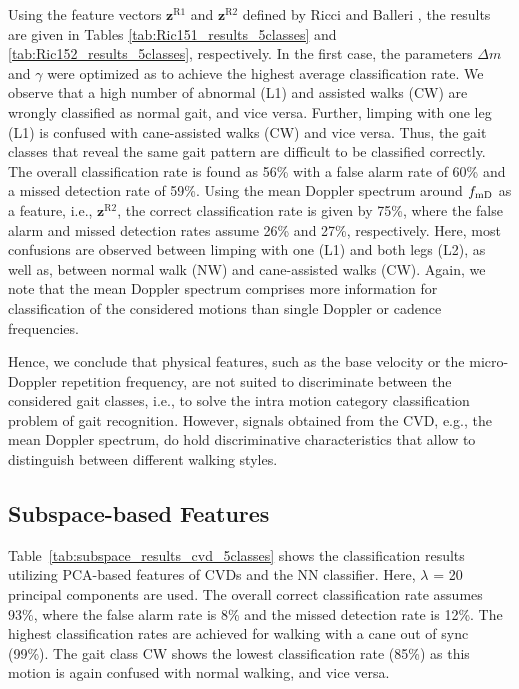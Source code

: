 Using the feature vectors $\mathbf{z}^{\text{R1}}$ and $\mathbf{z}^{\text{R2}}$ defined by Ricci and Balleri \cite{Ric15}, the results are given in Tables \ref{tab:Ric151_results_5classes} and \ref{tab:Ric152_results_5classes}, respectively. In the first case, the parameters $\Delta m$ and $\gamma$ were optimized as to achieve the highest average classification rate. We observe that a high number of abnormal (L1) and assisted walks (CW) are wrongly classified as normal gait, and vice versa. Further, limping with one leg (L1) is confused with cane-assisted walks (CW) and vice versa. Thus, the gait classes that reveal the same gait pattern are difficult to be classified correctly. The overall classification rate is found as 56\% with a false alarm rate of 60\% and a missed detection rate of 59\%. Using the mean Doppler spectrum around ${f_\text{mD}}$ as a feature, i.e., $\mathbf{z}^{\text{R2}}$, the correct classification rate is given by 75\%, where the false alarm and missed detection rates assume 26\% and 27\%, respectively. Here, most confusions are observed between limping with one (L1) and both legs (L2), as well as, between normal walk (NW) and cane-assisted walks (CW). Again, we note that the mean Doppler spectrum comprises more information for classification of the considered motions than single Doppler or cadence frequencies.

Hence, we conclude that physical features, such as the base velocity or the micro-Doppler repetition frequency, are not suited to discriminate between the considered gait classes, i.e., to solve the intra motion category classification problem of gait recognition. However, signals obtained from the CVD, e.g., the mean Doppler spectrum, do hold discriminative characteristics that allow to distinguish between different walking styles.

\subsection{Subspace-based Features}

Table~\ref{tab:subspace_results_cvd_5classes} shows the classification results utilizing PCA-based features of CVDs and the NN classifier. Here, $\lambda$ = 20 principal components are used. The overall correct classification rate assumes 93\%, where the false alarm rate is 8\% and the missed detection rate is 12\%. The highest classification rates are achieved for walking with a cane out of sync (99\%). The gait class CW shows the lowest classification rate (85\%) as this motion is again confused with normal walking, and vice versa.

